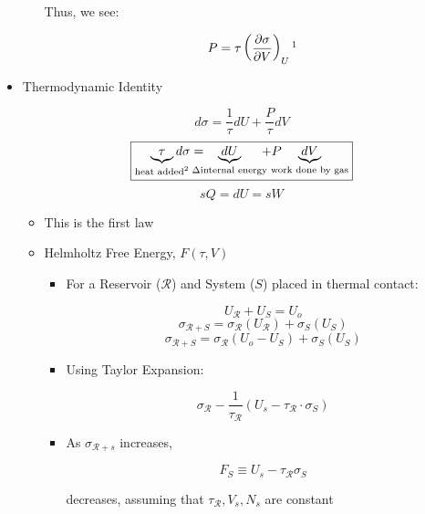 \begin{itemize}
\begin{itemize}
        Thus, we see:

        $$P=\tau\left( \frac{\partial \sigma}{\partial V} \right)_U\footnote{Note: the negative sign is dropped because entropy can only increase, and pressure is always positive}$$

    \end{itemize}

  \item Thermodynamic Identity
        
    $$d\sigma=\frac{1}{\tau}dU+\frac{P}{\tau}dV$$
    $$\boxed{\underbrace{\tau}_{\text{heat added\footnote{to $S$ in a reversible process}}}\hspace{-12pt}d\sigma=\hspace{-12pt}\underbrace{dU}_{\Delta\text{internal energy}}\hspace{-6pt}+P\hspace{-10pt}\underbrace{dV}_{\text{work done by gas}}}$$
    $$sQ=dU=sW$$

    \begin{itemize}

      \item This is the first law

      \item Helmholtz Free Energy, $F(\tau,V)$

        \begin{itemize}

          \item For a Reservoir ($\mathcal{R}$) and System ($S$) placed in thermal contact:

            $$U_{\mathcal{R}}+U_S=U_o$$
            $$\sigma_{\mathcal{R}+S}=\sigma_{\mathcal{R}}\left( U_{\mathcal{R}} \right)+\sigma_S\left( U_S \right)$$
            $$\sigma_{\mathcal{R}+S}=\sigma_{\mathcal{R}}\left( U_o -U_S \right)+\sigma_S\left( U_S \right)$$

          \item Using Taylor Expansion:

            $$\sigma_{\mathcal{R}}-\frac{1}{\tau_{\mathcal{R}}}\left( U_s-\tau_{\mathcal{R}}\cdot\sigma_S \right)$$

          \item As $\sigma_{\mathcal{R}+s}$ increases,

            $$F_S\equiv U_s-\tau_{\mathcal{R}}\sigma_S$$

            decreases, assuming that $\tau_{\mathcal{R}},V_s,N_s$ are constant

        \end{itemize}


\end{itemize}
\end{itemize}
